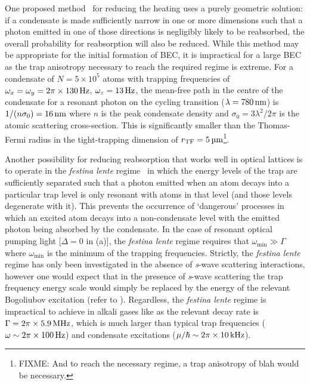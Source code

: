 One proposed method~\citep{Castin:1998,Vengalattore:2003} for reducing the heating uses a purely geometric solution: if a condensate is made sufficiently narrow in one or more dimensions such that a photon emitted in one of those directions is negligibly likely to be reabsorbed, the overall probability for reabsorption will also be reduced.  While this method may be appropriate for the initial formation of BEC, it is impractical for a large BEC as the trap anisotropy necessary to reach the required regime is extreme.  For a  condensate of $N = 5\times 10^5$ atoms with trapping frequencies of $\omega_x = \omega_y = \unit[2\pi \times 130]{Hz}$, $\omega_z = \unit[13]{Hz}$, the mean-free path in the centre of the condensate for a resonant photon on the cycling transition ($\lambda = \unit[780]{nm}$) is $1/(n \sigma_0) = \unit[16]{nm}$ where $n$ is the peak condensate density and $\sigma_0 = 3 \lambda^2/2 \pi$ is the atomic scattering cross-section.  This is significantly smaller than the Thomas-Fermi radius in the tight-trapping dimension of $r_\text{TF} = \unit[5]{\micro m}$\footnote{FIXME: And to reach the necessary regime, a trap anisotropy of blah would be necessary.}.

Another possibility for reducing reabsorption that works well in optical lattices is to operate in the \emph{festina lente} regime~\citep{Wolf:2000,Santos:1999qf,Cirac:1996,Castin:1998} in which the energy levels of the trap are sufficiently separated such that a photon emitted when an atom decays into a particular trap level is only resonant with atoms in that level (and those levels degenerate with it).  This prevents the occurrence of `dangerous' processes in which an excited atom decays into a non-condensate level with the emitted photon being absorbed by the condensate.  In the case of resonant optical pumping light [$\Delta = 0$ in (a)], the \emph{festina lente} regime requires that $\omega_\text{min} \gg \Gamma$  where $\omega_\text{min}$ is the minimum of the trapping frequencies.  Strictly, the \emph{festina lente} regime has only been investigated in the absence of \emph{s}-wave scattering interactions, however one would expect that in the presence of \emph{s}-wave scattering the trap frequency energy scale would simply be replaced by the energy of the relevant Bogoliubov excitation (refer to ).  Regardless, the \emph{festina lente} regime is impractical to achieve in alkali gases like  as the relevant decay rate is $\Gamma = \unit[2\pi\times 5.9]{MHz}$, which is much larger than typical trap frequencies ($\omega \sim \unit[2\pi \times 100]{Hz}$) and condensate excitations ($\mu/\hbar \sim \unit[2\pi \times 10]{kHz}$).


